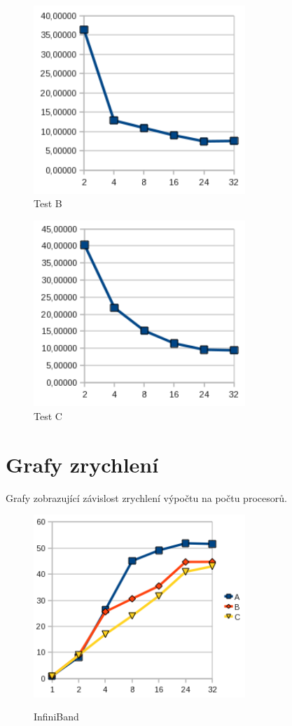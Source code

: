 \documentclass[12pt]{article}
\begin{document}
\begin{figure}[H]
\begin{center}
\includegraphics[width=8cm]{grafy-zprava/testBeth.png}
\caption{Test B}
\label{fig:testBether}
\end{center}
\end{figure}

\begin{figure}[H]
\begin{center}
\includegraphics[width=8cm]{grafy-zprava/testCeth.png}
\caption{Test C}
\label{fig:testCether}
\end{center}
\end{figure}

\section{Grafy zrychlení}
Grafy zobrazující závislost zrychlení výpočtu na počtu procesorů.
\begin{figure}[H]
\begin{center}
\includegraphics[width=8cm]{grafy-zprava/zrychleniinf.png}
\label{fig:zrychleniinf}
\caption{InfiniBand}
\end{center}
\end{figure}
\end{document}
